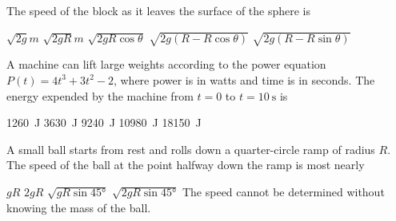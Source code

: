 \documentclass{../../../oss-apphys-exam}
\begin{document}
\begin{multicols*}{2}
\begin{questions}
    \question The speed of the block as it leaves the surface of the sphere is
    \label{sphere2}
    \begin{choices}
      \choice $\displaystyle\sqrt{2g}{m}$
      \choice $\displaystyle\sqrt{2gR}{m}$
      \choice $\displaystyle\sqrt{2gR\cos\theta}$
      \choice $\displaystyle\sqrt{2g(R-R\cos\theta)}$
      \choice $\displaystyle\sqrt{2g(R-R\sin\theta)}$
    \end{choices}
    
  \item A machine can lift large weights according to the power equation
    $P(t)=4t^3+3t^2-2$, where power is in watts and time is in seconds. The
    energy expended by the machine from $t=0$ to $t=\SI{10}{\second}$ is
    \begin{choices}
      \choice \SI{1260}{\joule}
      \choice \SI{3630}{\joule}
      \choice \SI{9240}{\joule}
      \choice \SI{10980}{\joule}
      \choice \SI{18150}{\joule}
    \end{choices}
    
    \question A small ball starts from rest and rolls down a quarter-circle
    ramp of radius $R$. The speed of the ball at the point halfway down the
    ramp is most nearly
    \begin{center}
    \end{center}
    \begin{choices}
      \choice $gR$
      \choice $2gR$
      \choice $\displaystyle\sqrt{gR\sin\ang{45}}$
      \choice $\displaystyle\sqrt{2gR\sin\ang{45}}$
      \choice The speed cannot be determined without knowing the mass of the
      ball.
    \end{choices}
  \end{questions}
\end{multicols*}
\newpage


\genfreedirections
\end{document}
